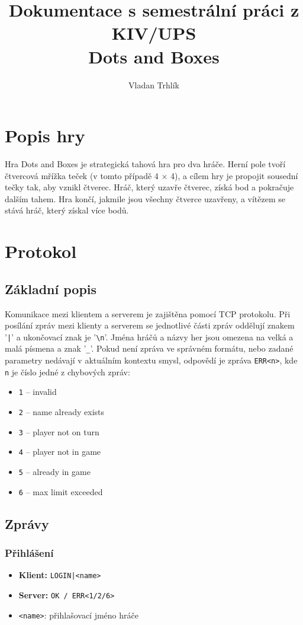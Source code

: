\documentclass[11pt,a4paper]{article}
\author{Vladan Trhlík}
\title{%
	Dokumentace s semestrální práci z KIV/UPS \\
	\large Dots and Boxes  \\
}
\begin{document}
\maketitle

\section{Popis hry}
Hra Dots and Boxes je strategická tahová hra pro dva hráče. Herní pole tvoří čtvercová mřížka teček (v tomto případě 4 × 4), a cílem hry je propojit sousední tečky tak, aby vznikl čtverec. Hráč, který uzavře čtverec, získá bod a pokračuje dalším tahem. Hra končí, jakmile jsou všechny čtverce uzavřeny, a vítězem se stává hráč, který získal více bodů.
\section{Protokol}

\subsection{Základní popis}
Komunikace mezi klientem a serverem je zajištěna pomocí TCP protokolu. Při posílání zpráv mezi klienty a serverem se jednotlivé části zpráv oddělují znakem '\texttt{|}' a ukončovací znak je '\texttt{\textbackslash n}'. Jména hráčů a názvy her jsou omezena na velká a malá písmena a znak '\texttt{\_}'. Pokud není zpráva ve správném formátu, nebo zadané parametry nedávají v aktuálním kontextu smysl, odpovědí je zpráva \texttt{ERR<n>}, kde \texttt{n} je číslo jedné z chybových zpráv:
\begin{itemize}
	\item \texttt{1} -- invalid
	\item \texttt{2} -- name already exists
	\item \texttt{3} -- player not on turn
	\item \texttt{4} -- player not in game
	\item \texttt{5} -- already in game
	\item \texttt{6} -- max limit exceeded
\end{itemize}

\subsection{Zprávy}
\subsubsection*{Přihlášení}
\begin{itemize}
	\item \textbf{Klient:} \texttt{LOGIN|<name>}
	\item \textbf{Server:} \texttt{OK / ERR<1/2/6>}
	\item \texttt{<name>}: přihlašovací jméno hráče
\end{itemize}
\end{document}

